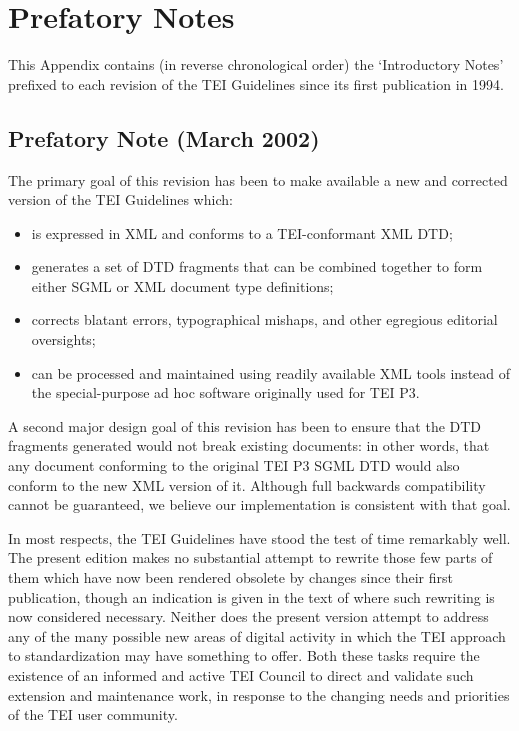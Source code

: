 
\section[{Prefatory Notes}]{Prefatory Notes}\label{PREFS}\par
This Appendix contains (in reverse chronological order) the ‘Introductory Notes’ prefixed to each revision of the TEI Guidelines since its first publication in 1994.
\subsection[{Prefatory Note (March 2002)}]{Prefatory Note (March 2002)}\label{p4pf02}\par
The primary goal of this revision has been to make available a new and corrected version of the TEI Guidelines which: \begin{itemize}
\item is expressed in XML and conforms to a TEI-conformant XML DTD;
\item generates a set of DTD fragments that can be combined together to form either SGML or XML document type definitions;
\item corrects blatant errors, typographical mishaps, and other egregious editorial oversights;
\item can be processed and maintained using readily available XML tools instead of the special-purpose ad hoc software originally used for TEI P3.
\end{itemize} \par
A second major design goal of this revision has been to ensure that the DTD fragments generated would not break existing documents: in other words, that any document conforming to the original TEI P3 SGML DTD would also conform to the new XML version of it. Although full backwards compatibility cannot be guaranteed, we believe our implementation is consistent with that goal. \par
In most respects, the TEI Guidelines have stood the test of time remarkably well. The present edition makes no substantial attempt to rewrite those few parts of them which have now been rendered obsolete by changes since their first publication, though an indication is given in the text of where such rewriting is now considered necessary. Neither does the present version attempt to address any of the many possible new areas of digital activity in which the TEI approach to standardization may have something to offer. Both these tasks require the existence of an informed and active TEI Council to direct and validate such extension and maintenance work, in response to the changing needs and priorities of the TEI user community. \par

